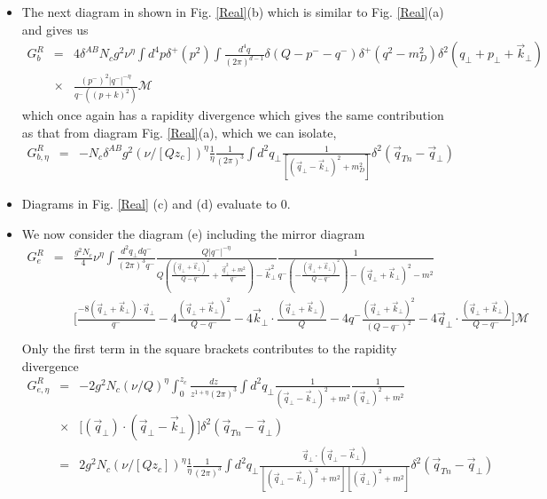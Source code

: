 \documentclass[letter,11pt]{article}
\newcommand{\nn}{\nonumber}
\newcommand{\bea}{\begin{eqnarray}}
\newcommand{\eea}{\end{eqnarray}}
\def\nn{\nonumber}
\begin{document}
\begin{itemize}
\item
The next diagram in shown in Fig. \ref{Real}(b) which is similar to Fig. \ref{Real}(a) and gives us 
\bea
 G_b^R &=& 4\delta^{AB}N_cg^2\nu^{\eta}\int d^4p \delta^+(p^2)\int \frac{d^4q}{(2\pi)^{d-1}}\delta(Q-p^--q^-)\delta^+(q^2-m_D^2)\delta^2(q_{\perp}+p_{\perp}+\vec{k}_{\perp})\nn\\
&\times& \frac{(p^-)^2|q^-|^{-\eta}}{q^-((p+k)^2)}\mathcal{M}
\eea
which once again has a rapidity divergence which gives the same contribution as that from diagram Fig. \ref{Real}(a), which we can isolate, 
\bea
 G_{b,\eta}^R&=&-N_c\delta^{AB}g^2(\nu/[Qz_c])^{\eta}\frac{1}{\eta}\frac{1}{(2\pi)^{3}}\int d^2q_{\perp}\frac{1}{[(\vec{q}_{\perp}-\vec{k}_{\perp})^2+m_D^2]}\delta^2(\vec{q}_{Tn}-\vec{q}_{\perp})
\eea
\item
Diagrams in Fig. \ref{Real} (c) and (d)  evaluate to 0. \\
\item
We now consider the diagram (e) including the mirror diagram
\small
\bea
  G_{e}^R&=& \frac{g^2N_c}{4}\nu^{\eta}\int \frac{d^2q_{\perp}dq^-}{(2\pi)^3q^-}\frac{Q|q^-|^{-\eta}}{Q(\frac{(\vec{q}_{\perp}+\vec{k}_{\perp})^2}{Q-q^-}+\frac{\vec{q}_{\perp}^2+m^2}{q^-})-\vec{k}_{\perp}^2}\frac{1}{q^-(-\frac{(\vec{q}_{\perp}+\vec{k}_{\perp})^2}{Q-q^-})-(\vec{q}_{\perp}+\vec{k}_{\perp})^2-m^2} \nn\\
&&\Bigg[\frac{-8(\vec{q}_{\perp}+\vec{k}_{\perp})\cdot \vec{q}_{\perp}}{q^-} - 4\frac{(\vec{q}_{\perp}+\vec{k}_{\perp})^2}{Q-q^-}-4\vec{k}_{\perp}\cdot \frac{(\vec{q}_{\perp}+\vec{k}_{\perp})}{Q}- 4q^-\frac{(\vec{q}_{\perp}+\vec{k}_{\perp})^2}{(Q-q^-)^2}-4\vec{q}_{\perp}\cdot \frac{(\vec{q}_{\perp}+\vec{k}_{\perp})}{Q-q^-}\Bigg]\mathcal{M}\nn\\
\eea
\normalsize
Only the first term in the square brackets contributes to the rapidity divergence 
\bea
 G_{e,\eta}^{R}&=&-2g^2N_c(\nu/Q)^{\eta}\int_0^{z_{c}} \frac{dz}{z^{1+\eta}(2\pi)^3}\int d^2q_{\perp}\frac{1}{(\vec{q}_{\perp}-\vec{k}_{\perp})^2+m^2}\frac{1}{(\vec{q}_{\perp})^2+m^2} \nn\\
&\times& \Bigg[(\vec{q}_{\perp})\cdot (\vec{q}_{\perp}-\vec{k}_{\perp})\Bigg]\delta^2(\vec{q}_{Tn}-\vec{q}_{\perp})\nn\\
&=& 2g^2N_c(\nu/[Qz_c])^{\eta}\frac{1}{\eta}\frac{1}{(2\pi)^3}\int d^2q_{\perp}\frac{\vec{q}_{\perp}\cdot (\vec{q}_{\perp}-\vec{k}_{\perp})}{[(\vec{q}_{\perp}-\vec{k}_{\perp})^2+m^2][(\vec{q}_{\perp})^2+m^2]}\delta^2(\vec{q}_{Tn}-\vec{q}_{\perp})\nn
\eea


\end{itemize}
\end{document}
